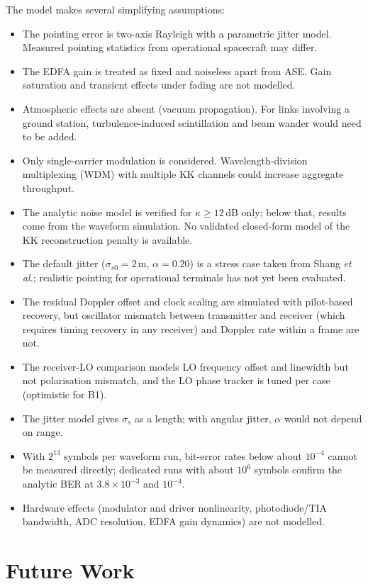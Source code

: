 The model makes several simplifying assumptions:
\begin{itemize}
\item The pointing error is two-axis Rayleigh with a parametric jitter model. Measured pointing statistics from operational spacecraft may differ.
\item The EDFA gain is treated as fixed and noiseless apart from ASE. Gain saturation and transient effects under fading are not modelled.
\item Atmospheric effects are absent (vacuum propagation). For links involving a ground station, turbulence-induced scintillation and beam wander would need to be added.
\item Only single-carrier modulation is considered. Wavelength-division multiplexing (WDM) with multiple KK channels could increase aggregate throughput.
\item The analytic noise model is verified for $\kappa\ge12$\,dB only; below that, results come from the waveform simulation. No validated closed-form model of the KK reconstruction penalty is available.
\item The default jitter ($\sigma_{s0}=2$\,m, $\alpha=0.20$) is a stress case taken from Shang \emph{et al.}; realistic pointing for operational terminals has not yet been evaluated.
\item The residual Doppler offset and clock scaling are simulated with pilot-based recovery, but oscillator mismatch between transmitter and receiver (which requires timing recovery in any receiver) and Doppler rate within a frame are not.
\item The receiver-LO comparison models LO frequency offset and linewidth but not polarisation mismatch, and the LO phase tracker is tuned per case (optimistic for B1).
\item The jitter model gives $\sigma_s$ as a length; with angular jitter, $\alpha$ would not depend on range.
\item With $2^{13}$ symbols per waveform run, bit-error rates below about $10^{-4}$ cannot be measured directly; dedicated runs with about $10^6$ symbols confirm the analytic BER at $3.8\times10^{-3}$ and $10^{-4}$.
\item Hardware effects (modulator and driver nonlinearity, photodiode/TIA bandwidth, ADC resolution, EDFA gain dynamics) are not modelled.
\end{itemize}

\section{Future Work}

